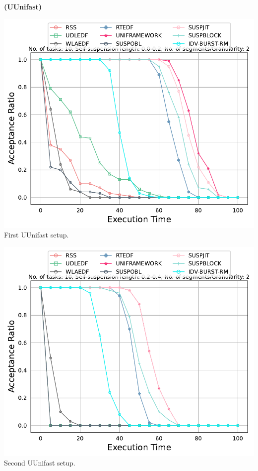 \documentclass[]{article}
\begin{document}
	\begin{minipage}[t]{0.48\linewidth}
		\centering
		\textbf{(UUnifast)}
		\vspace{0.3cm}
		
		\includegraphics[width=\linewidth]{comparison_1stSetups_uni.pdf}
		First UUnifast setup.
		\vspace{0.3cm}
		
		\includegraphics[width=\linewidth]{comparison_2ndSetups_uni.pdf}
		Second UUnifast setup.
		\vspace{0.3cm}
		

		
	\end{minipage}\hfill
\end{document}
